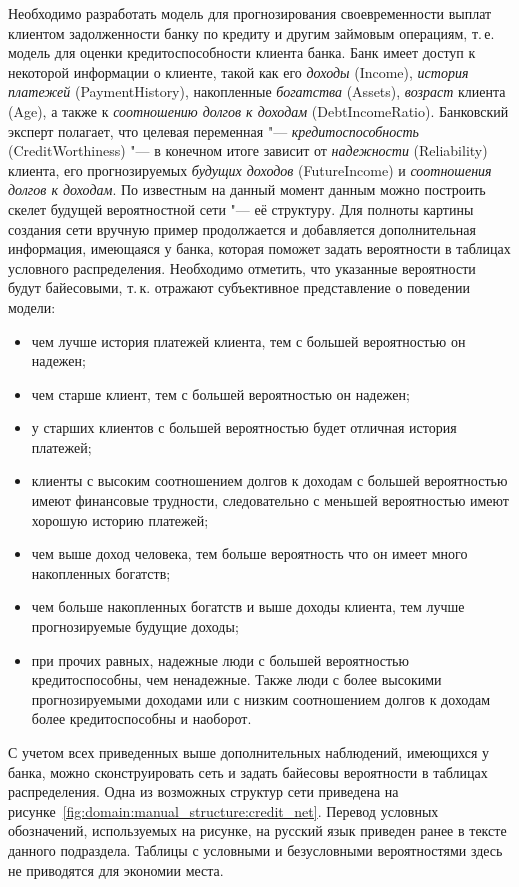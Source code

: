 Необходимо разработать модель для  прогнозирования своевременности выплат клиентом задолженности банку по кредиту и другим займовым операциям, т.\,е. модель для оценки кредитоспособности клиента банка.
Банк имеет доступ к некоторой информации о клиенте, такой как его \emph{доходы} (Income), \emph{история платежей} (PaymentHistory), накопленные \emph{богатства} (Assets), \emph{возраст} клиента (Age), а также к \emph{соотношению долгов к доходам} (DebtIncomeRatio).
Банковский эксперт полагает, что целевая переменная "--- \emph{кредитоспособность} (CreditWorthiness) "--- в конечном итоге зависит от \emph{надежности} (Reliability) клиента, его прогнозируемых \emph{будущих доходов} (FutureIncome) и \emph{соотношения долгов к доходам}.
По известным на данный момент данным можно построить скелет будущей вероятностной сети "--- её структуру.
Для полноты картины создания сети вручную пример продолжается и добавляется дополнительная информация, имеющаяся у банка, которая поможет задать вероятности в таблицах условного распределения.
Необходимо отметить, что указанные вероятности будут байесовыми, т.\,к. отражают субъективное представление о поведении модели:
\begin{itemize}
    \item чем лучше история платежей клиента, тем с большей вероятностью он надежен;
    \item чем старше клиент, тем с большей вероятностью он надежен;
    \item у старших клиентов с большей вероятностью будет отличная история платежей;
    \item клиенты с высоким соотношением долгов к доходам с большей вероятностью имеют финансовые трудности, следовательно с меньшей вероятностью имеют хорошую историю платежей;
  \item чем выше доход человека, тем больше вероятность что он имеет много накопленных богатств;
  \item чем больше накопленных богатств и выше доходы клиента, тем лучше прогнозируемые будущие доходы;
  \item при прочих равных, надежные люди с большей вероятностью кредитоспособны, чем ненадежные. Также люди с более высокими прогнозируемыми доходами или с низким соотношением долгов к доходам более кредитоспособны и наоборот.
\end{itemize}

С учетом всех приведенных выше дополнительных наблюдений, имеющихся у банка, можно сконструировать сеть и задать байесовы вероятности в таблицах распределения.
Одна из возможных структур сети приведена на рисунке~\ref{fig:domain:manual_structure:credit_net}.
Перевод условных обозначений, используемых на рисунке, на русский язык приведен ранее в тексте данного подраздела.
Таблицы с условными и безусловными вероятностями здесь не приводятся для экономии места.

